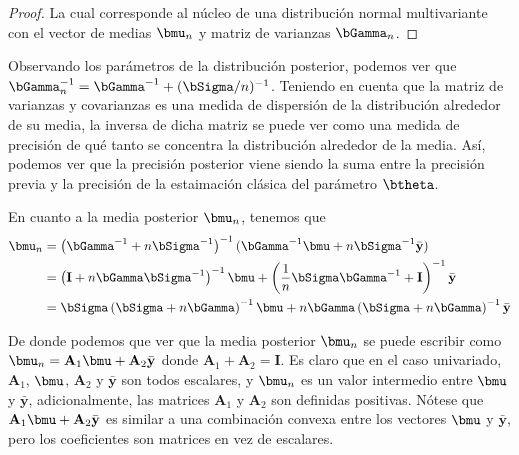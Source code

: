 \begin{proof}
La cual corresponde al n\'ucleo de una distribuci\'on normal multivariante con el vector de medias $\bmu_n$ y matriz de varianzas $\bGamma_n$.
\end{proof}

Observando los par\'ametros de la distribuci\'on posterior, podemos ver que $\bGamma_n^{-1} = \bGamma^{-1}+(\bSigma/n)^{-1}$. Teniendo en cuenta que la matriz de varianzas y covarianzas es una medida de dispersi\'on de la distribuci\'on alrededor de su media, la inversa de dicha matriz se puede ver como una medida de precisi\'on de qu\'e tanto se concentra la distribuci\'on alrededor de la media. As\'i, podemos ver que la precisi\'on posterior viene siendo la suma entre la precisi\'on previa y la precisi\'on de la estaimaci\'on cl\'asica del parámetro $\btheta$.

En cuanto a la media posterior $\bmu_n$, tenemos que
\begin{align*}
\bmu_n&=\left(\bGamma^{-1}+n\bSigma^{-1}\right)^{-1}
(\bGamma^{-1}\bmu+n \bSigma^{-1}\bar{\mathbf{y}})\\
&=\left(\mathbf{I}+n\bGamma\bSigma^{-1}\right)^{-1}\bmu+\left(\frac{1}{n}\bSigma\bGamma^{-1}+\mathbf{I}\right)^{-1}\bar{\mathbf{y}}\\
&=\bSigma\left(\bSigma+n\bGamma\right)^{-1}\bmu+n\bGamma\left(\bSigma+n\bGamma\right)^{-1}\bar{\mathbf{y}}
\end{align*}

De donde podemos que ver que la media posterior $\bmu_n$ se puede escribir como $\bmu_n=\mathbf{A}_1\bmu+\mathbf{A}_2\bar{\mathbf{y}}$ donde $\mathbf{A}_1+\mathbf{A}_2=\mathbf{I}$. Es claro que en el caso univariado, $\mathbf{A}_1$, $\bmu$, $\mathbf{A}_2$ y $\bar{\mathbf{y}}$ son todos escalares, y $\bmu_n$ es un valor intermedio entre $\bmu$ y $\bar{\mathbf{y}}$, adicionalmente, las matrices $\mathbf{A}_1$ y $\mathbf{A}_2$ son definidas positivas. N\'otese que $\mathbf{A}_1\bmu+\mathbf{A}_2\bar{\mathbf{y}}$ es similar a una combinaci\'on convexa entre los vectores $\bmu$ y $\bar{\mathbf{y}}$, pero los coeficientes son matrices en vez de escalares. 

